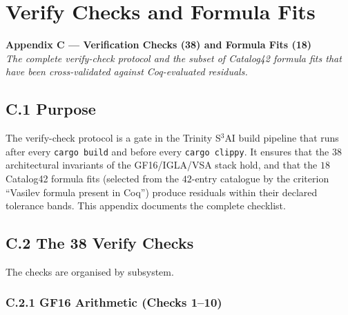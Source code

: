 \chapter{Verify Checks and Formula Fits}
\label{app:C-verify-checks}

\begin{center}
\textbf{Appendix C --- Verification Checks (38) and Formula Fits (18)} \\[1em]
\textit{The complete verify-check protocol and the subset of Catalog42
formula fits that have been cross-validated against Coq-evaluated
residuals.}
\end{center}

\section*{C.1 Purpose}
\label{app:C-purpose}

The verify-check protocol is a gate in the Trinity S$^{3}$AI build
pipeline that runs after every \texttt{cargo build} and before every
\texttt{cargo clippy}. It ensures that the $38$ architectural
invariants of the GF16/IGLA/VSA stack hold, and that the $18$
Catalog42 formula fits (selected from the $42$-entry catalogue by the
criterion ``Vasilev formula present in Coq'') produce residuals
within their declared tolerance bands. This appendix documents the
complete checklist.

\section*{C.2 The 38 Verify Checks}
\label{app:C-verify-38}

The checks are organised by subsystem.

\subsection*{C.2.1 GF16 Arithmetic (Checks 1--10)}

